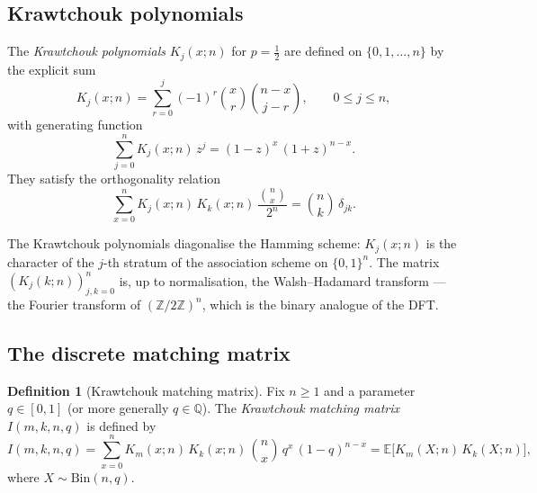 \documentclass[11pt,a4paper]{article}
\theoremstyle{plain}
\theoremstyle{definition}
\newtheorem{definition}[theorem]{Definition}
\begin{document}
\subsection{Krawtchouk polynomials}

The \emph{Krawtchouk polynomials} $K_j(x; n)$ for $p = \tfrac12$
are defined on $\{0, 1, \ldots, n\}$ by the explicit sum
\begin{equation}\label{eq:kraw-def}
  K_j(x; n) = \sum_{r=0}^{j} (-1)^r \binom{x}{r} \binom{n-x}{j-r},
  \qquad 0 \le j \le n,
\end{equation}
with generating function
\begin{equation}\label{eq:kraw-gf}
  \sum_{j=0}^{n} K_j(x; n)\, z^j = (1-z)^x\, (1+z)^{n-x}.
\end{equation}
They satisfy the orthogonality relation
\begin{equation}\label{eq:kraw-orth}
  \sum_{x=0}^{n} K_j(x; n)\, K_k(x; n)\, \frac{\binom{n}{x}}{2^n}
  = \binom{n}{k}\, \delta_{jk}.
\end{equation}

\begin{tcolorbox}[colback=yellow!10, colframe=yellow!10, boxrule=0pt,
  sharp corners]
The Krawtchouk polynomials diagonalise the Hamming scheme: $K_j(x; n)$
is the character of the $j$-th stratum of the association scheme on
$\{0,1\}^n$. The matrix $(K_j(k; n))_{j,k=0}^n$ is, up to
normalisation, the Walsh--Hadamard transform --- the Fourier transform
of $(\mathbb{Z}/2\mathbb{Z})^n$, which is the binary analogue of
the DFT.
\end{tcolorbox}

\subsection{The discrete matching matrix}

\begin{tcolorbox}[colback=green!8, colframe=green!8, boxrule=0pt,
  sharp corners]
\begin{definition}[Krawtchouk matching matrix]\label{def:kraw-match}
Fix $n \ge 1$ and a parameter $q \in [0,1]$ (or more generally
$q \in \mathbb{Q}$). The \emph{Krawtchouk matching matrix}
$I(m, k, n, q)$ is defined by
\begin{equation}\label{eq:Imk}
  I(m, k, n, q)
  = \sum_{x=0}^{n} K_m(x; n)\, K_k(x; n)\, \binom{n}{x}\, q^x\, (1-q)^{n-x}
  = \mathbb{E}\bigl[K_m(X; n)\, K_k(X; n)\bigr],
\end{equation}
where $X \sim \mathrm{Bin}(n, q)$.
\end{definition}
\end{tcolorbox}
\end{document}
